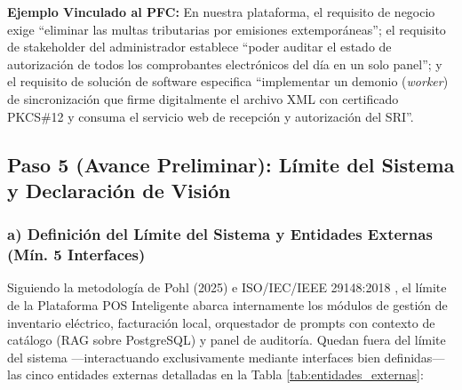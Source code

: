 \textbf{Ejemplo Vinculado al PFC:} En nuestra plataforma, el requisito de negocio exige ``eliminar las multas tributarias por emisiones extemporáneas''; el requisito de stakeholder del administrador establece ``poder auditar el estado de autorización de todos los comprobantes electrónicos del día en un solo panel''; y el requisito de solución de software especifica ``implementar un demonio (\textit{worker}) de sincronización que firme digitalmente el archivo XML con certificado PKCS\#12 y consuma el servicio web de recepción y autorización del SRI''.


\subsection{Paso 5 (Avance Preliminar): Límite del Sistema y Declaración de Visión}

\subsubsection{a) Definición del Límite del Sistema y Entidades Externas (Mín. 5 Interfaces)}
Siguiendo la metodología de Pohl (2025) \cite{pohl2025} e ISO/IEC/IEEE 29148:2018 \cite{ieee29148}, el límite de la Plataforma POS Inteligente abarca internamente los módulos de gestión de inventario eléctrico, facturación local, orquestador de prompts con contexto de catálogo (RAG sobre PostgreSQL) y panel de auditoría. Quedan fuera del límite del sistema —interactuando exclusivamente mediante interfaces bien definidas— las cinco entidades externas detalladas en la Tabla \ref{tab:entidades_externas}:


